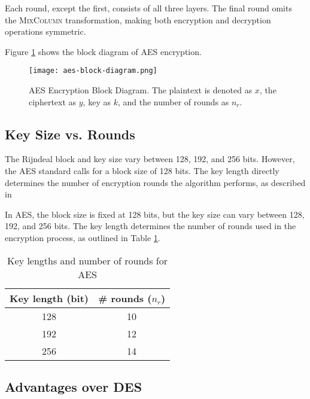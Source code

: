 Each round, except the first, consists of all three layers. 
The final round omits the \textsc{MixColumn} transformation, making both encryption and decryption operations symmetric.

Figure \ref{fig:aes-block-diagram} shows the block diagram of AES encryption.

\begin{figure}[h] %
    \centering
    \texttt{[image: aes-block-diagram.png]} %
    \caption{
        AES Encryption Block Diagram.
        The plaintext is denoted as $x$, the ciphertext as $y$, key as $k$, and the number of rounds as $n_r$.
    }
    \label{fig:aes-block-diagram} %
\end{figure}
 


\subsection{Key Size vs. Rounds}

The Rijndeal block and key size vary between 128, 192, and 256 bits.
However, the AES standard calls for a block size of 128 bits. 
The key length directly determines the number of encryption rounds the algorithm performs, as described in 

In AES, the block size is fixed at 128 bits, but the key size can vary between 128, 192, and 256 bits. 
The key length determines the number of rounds used in the encryption process, as outlined in Table \ref{table:key-length-rounds}.

\begin{table}[h]
    \centering
    \begin{tabular}{c|c}
        \textbf{Key length (bit)} & \textbf{\# rounds ($n_r$)} \\ 
        \hline
        128 & 10 \\  
        192 & 12 \\  
        256 & 14 \\  
    \end{tabular}
    \caption{Key lengths and number of rounds for AES}
    \label{table:key-length-rounds}
\end{table}



\subsection{Advantages over DES}

